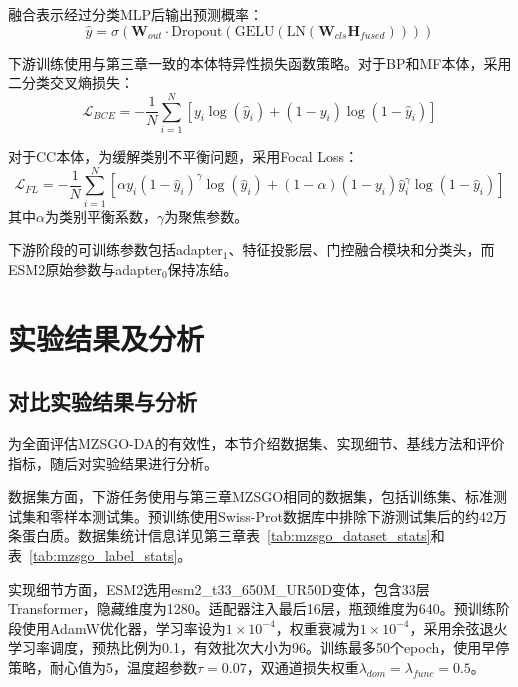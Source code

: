 融合表示经过分类MLP后输出预测概率：
\begin{equation}
    \hat{y} = \sigma\left(\mathbf{W}_{out}\cdot \text{Dropout}\left(\text{GELU}\left(\text{LN}(\mathbf{W}_{cls}\mathbf{H}_{fused})\right)\right)\right)
\end{equation}

下游训练使用与第三章一致的本体特异性损失函数策略。对于BP和MF本体，采用二分类交叉熵损失：
\begin{equation}
    \mathcal{L}_{BCE} = -\frac{1}{N}\sum_{i=1}^{N}
    \left[
    y_i\log(\hat{y}_i) + (1-y_i)\log(1-\hat{y}_i)
    \right]
\end{equation}

对于CC本体，为缓解类别不平衡问题，采用Focal Loss：
\begin{equation}
    \mathcal{L}_{FL} = -\frac{1}{N}\sum_{i=1}^{N}
    \left[
    \alpha y_i(1-\hat{y}_i)^{\gamma}\log(\hat{y}_i)
    + (1-\alpha)(1-y_i)\hat{y}_i^{\gamma}\log(1-\hat{y}_i)
    \right]
\end{equation}
其中$\alpha$为类别平衡系数，$\gamma$为聚焦参数。

下游阶段的可训练参数包括adapter$_1$、特征投影层、门控融合模块和分类头，而ESM2原始参数与adapter$_0$保持冻结。

\section{实验结果及分析}

\subsection{对比实验结果与分析}

为全面评估MZSGO-DA的有效性，本节介绍数据集、实现细节、基线方法和评价指标，随后对实验结果进行分析。

数据集方面，下游任务使用与第三章MZSGO相同的数据集，包括训练集、标准测试集和零样本测试集。预训练使用Swiss-Prot数据库中排除下游测试集后的约42万条蛋白质。数据集统计信息详见第三章表~\ref{tab:mzsgo_dataset_stats}和表~\ref{tab:mzsgo_label_stats}。

实现细节方面，ESM2选用esm2\_t33\_650M\_UR50D变体，包含33层Transformer，隐藏维度为1280。适配器注入最后16层，瓶颈维度为640。预训练阶段使用AdamW\cite{loshchilov2019decoupled}优化器，学习率设为$1\times10^{-4}$，权重衰减为$1\times10^{-4}$，采用余弦退火学习率调度，预热比例为0.1，有效批次大小为96。训练最多50个epoch，使用早停策略，耐心值为5，温度超参数$\tau=0.07$，双通道损失权重$\lambda_{dom}=\lambda_{func}=0.5$。

